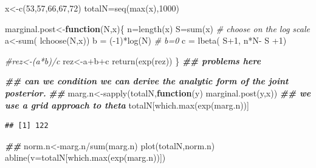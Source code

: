 \documentclass[
]{book}
\newenvironment{Shaded}{\begin{snugshade}}{\end{snugshade}}
\newcommand{\AttributeTok}[1]{\textcolor[rgb]{0.77,0.63,0.00}{#1}}
\newcommand{\CommentTok}[1]{\textcolor[rgb]{0.56,0.35,0.01}{\textit{#1}}}
\newcommand{\ControlFlowTok}[1]{\textcolor[rgb]{0.13,0.29,0.53}{\textbf{#1}}}
\newcommand{\DecValTok}[1]{\textcolor[rgb]{0.00,0.00,0.81}{#1}}
\newcommand{\DocumentationTok}[1]{\textcolor[rgb]{0.56,0.35,0.01}{\textbf{\textit{#1}}}}
\newcommand{\FunctionTok}[1]{\textcolor[rgb]{0.00,0.00,0.00}{#1}}
\newcommand{\NormalTok}[1]{#1}
\newcommand{\OtherTok}[1]{\textcolor[rgb]{0.56,0.35,0.01}{#1}}
\newcommand{\SpecialCharTok}[1]{\textcolor[rgb]{0.00,0.00,0.00}{#1}}
\theoremstyle{definition}
\theoremstyle{definition}
\theoremstyle{definition}
\theoremstyle{definition}
\theoremstyle{remark}
\begin{document}
\begin{Shaded}
\begin{Highlighting}[]
\NormalTok{ x}\OtherTok{\textless{}{-}}\FunctionTok{c}\NormalTok{(}\DecValTok{53}\NormalTok{,}\DecValTok{57}\NormalTok{,}\DecValTok{66}\NormalTok{,}\DecValTok{67}\NormalTok{,}\DecValTok{72}\NormalTok{)}
\NormalTok{ totalN}\OtherTok{=}\FunctionTok{seq}\NormalTok{(}\FunctionTok{max}\NormalTok{(x),}\DecValTok{1000}\NormalTok{)}
 
\NormalTok{ marginal.post}\OtherTok{\textless{}{-}}\ControlFlowTok{function}\NormalTok{(N,x)\{}
\NormalTok{   n}\OtherTok{=}\FunctionTok{length}\NormalTok{(x)}
\NormalTok{   S}\OtherTok{=}\FunctionTok{sum}\NormalTok{(x)}
   \CommentTok{\# choose on the log scale}
\NormalTok{   a}\OtherTok{\textless{}{-}}\FunctionTok{sum}\NormalTok{( }\FunctionTok{lchoose}\NormalTok{(N,x))}
\NormalTok{    b }\OtherTok{=}\NormalTok{ (}\SpecialCharTok{{-}}\DecValTok{1}\NormalTok{)}\SpecialCharTok{*}\FunctionTok{log}\NormalTok{(N)}
  \CommentTok{\# b=0}
\NormalTok{   c }\OtherTok{=} \FunctionTok{lbeta}\NormalTok{( S}\SpecialCharTok{+}\DecValTok{1}\NormalTok{, n}\SpecialCharTok{*}\NormalTok{N}\SpecialCharTok{{-}}\NormalTok{ S }\SpecialCharTok{+}\DecValTok{1}\NormalTok{)}
   
   \CommentTok{\#rez\textless{}{-}(a*b)/c}
\NormalTok{   rez}\OtherTok{\textless{}{-}}\NormalTok{a}\SpecialCharTok{+}\NormalTok{b}\SpecialCharTok{+}\NormalTok{c}
   \FunctionTok{return}\NormalTok{(}\FunctionTok{exp}\NormalTok{(rez))}
\NormalTok{ \} }\DocumentationTok{\#\# problems here}
 
 \DocumentationTok{\#\# can we condition we can derive the analytic form of the joint posterior.}
 \DocumentationTok{\#\# }
\NormalTok{  marg.n}\OtherTok{\textless{}{-}}\FunctionTok{sapply}\NormalTok{(totalN,}\ControlFlowTok{function}\NormalTok{(y) }\FunctionTok{marginal.post}\NormalTok{(y,x))}
 \DocumentationTok{\#\# we use a grid approach to theta}
\NormalTok{totalN[}\FunctionTok{which.max}\NormalTok{(}\FunctionTok{exp}\NormalTok{(marg.n))]}
\end{Highlighting}
\end{Shaded}

\begin{verbatim}
## [1] 122
\end{verbatim}

\begin{Shaded}
\begin{Highlighting}[]
  \DocumentationTok{\#\#}
\NormalTok{norm.n}\OtherTok{\textless{}{-}}\NormalTok{marg.n}\SpecialCharTok{/}\FunctionTok{sum}\NormalTok{(marg.n)}
\FunctionTok{plot}\NormalTok{(totalN,norm.n)}
\FunctionTok{abline}\NormalTok{(}\AttributeTok{v=}\NormalTok{totalN[}\FunctionTok{which.max}\NormalTok{(}\FunctionTok{exp}\NormalTok{(marg.n))])}
\end{Highlighting}
\end{Shaded}
\end{document}
